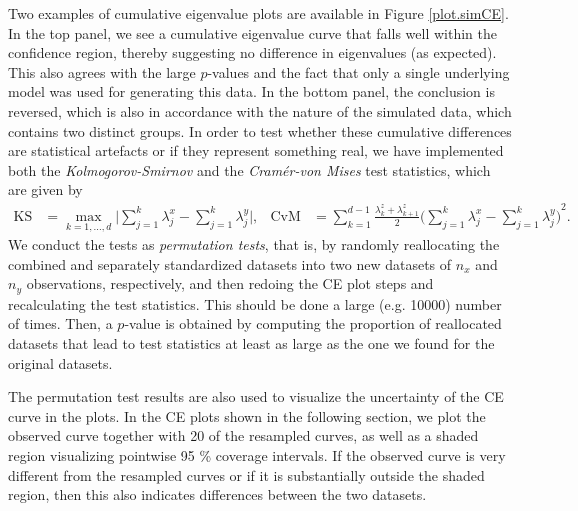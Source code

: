 \documentclass[a4paper,12pt]{article}
\begin{document}
Two examples of cumulative eigenvalue plots are available in Figure \ref{plot.simCE}. In the top panel, we see a cumulative eigenvalue curve that falls well within the confidence region, thereby suggesting no difference in eigenvalues (as expected). This also agrees with the large $p$-values and the fact that only a single underlying model was used for generating this data. In the bottom panel, the conclusion is reversed, which is also in accordance with the nature of the simulated data, which contains two distinct groups. In order to test whether these cumulative differences are statistical artefacts or if they represent something real, we have implemented both the \emph{Kolmogorov-Smirnov} and the \emph{Cram\'er-von Mises} test statistics, which are given by
\begin{align*}
\text{KS} &= \max_{k=1,\dotsc,d} \bigg\lvert \sum_{j=1}^k \lambda_{j}^x - \sum_{j=1}^k \lambda_{j}^y \bigg\rvert, &
\text{CvM} &= \sum_{k=1}^{d-1} \frac{\lambda_k^z + \lambda_{k+1}^z}{2} {\bigg( \sum_{j=1}^k \lambda_{j}^x - \sum_{j=1}^k \lambda_{j}^y \bigg)}^2.
\end{align*}
We conduct the tests as \textit{permutation tests}, that is, by randomly reallocating the combined and separately standardized datasets into two new datasets of $n_x$ and $n_y$ observations, respectively, and then redoing the CE plot steps and recalculating the test statistics. This should be done a large (e.g. 10000) number of times. Then, a $p$-value is obtained by computing the proportion of reallocated datasets that lead to %
test statistics at least as large as %
the one we found for the original datasets.

The permutation test results are also used to visualize the uncertainty of the CE curve in the plots. In the CE plots shown in the following section, we plot the observed curve together with 20 of the resampled curves, as well as a shaded region visualizing pointwise 95 \% coverage intervals. If the observed curve is very different from the resampled curves or if it is substantially outside the shaded region, then this also indicates differences between the two datasets.
\end{document}
